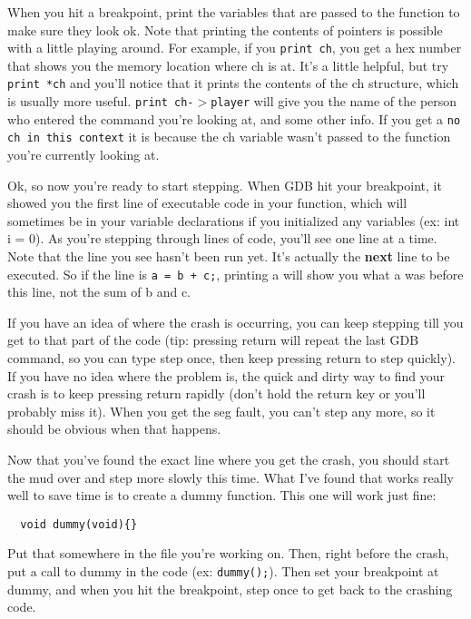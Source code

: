 \documentclass[11pt]{article}
\begin{document}
\par
When you hit a breakpoint, print the variables that are passed to the function to make sure they look ok.  Note that printing the contents of pointers is possible with a little playing around.  For example, if you \texttt{print ch}, you get a hex number that shows you the memory location where ch is at.  It's a little helpful, but try \texttt{print *ch} and you'll notice that it prints the contents of the ch structure, which is usually more useful.  \texttt{print ch-$>$player} will give you the name of the person who entered the command you're looking at, and some other info.  If you get a \texttt{no ch in this context} it is because the ch variable wasn't passed to the function you're currently looking at.
\par
Ok, so now you're ready to start stepping.  When GDB hit your breakpoint, it showed you the first line of executable code in your function, which will sometimes be in your variable declarations if you initialized any variables (ex: int i = 0).  As you're stepping through lines of code, you'll see one line at a time.  Note that the line you see hasn't been run yet.  It's actually the {\bf next} line to be executed.  So if the line is \texttt{a = b + c;}, printing a will show you what a was before this line, not the sum of b and c.
\par
If you have an idea of where the crash is occurring, you can keep stepping till you get to that part of the code (tip: pressing return will repeat the last GDB command, so you can type step once, then keep pressing return to step quickly).  If you have no idea where the problem is, the quick and dirty way to find your crash is to keep pressing return rapidly (don't hold the return key or you'll probably miss it).  When you get the seg fault, you can't step any more, so it should be obvious when that happens.
\par
Now that you've found the exact line where you get the crash, you should start the mud over and step more slowly this time. What I've found that works really well to save time is to create a dummy function.  This one will work just fine:
\begin{verbatim}
  void dummy(void){}
\end{verbatim}
Put that somewhere in the file you're working on.  Then, right before the crash, put a call to dummy in the code (ex: \texttt{dummy();}).  Then set your breakpoint at dummy, and when you hit the breakpoint, step once to get back to the crashing code.
\par
\end{document}
